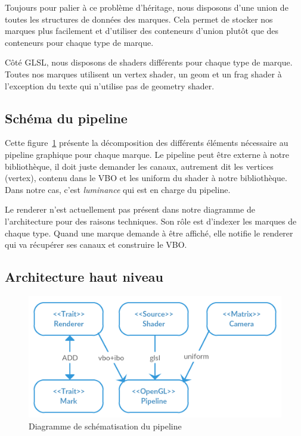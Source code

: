 \documentclass[12pt]{article}
\begin{document}
Toujours pour palier à ce problème d'héritage, nous disposons d'une union de toutes les structures
de données des marques. Cela permet de stocker nos marques plus facilement et d'utiliser des conteneurs d'union plutôt que des conteneurs pour chaque type de marque.

Côté GLSL, nous disposons de shaders différents pour chaque type de marque. Toutes nos marques utilisent un vertex shader, un \gls{geom} et un \gls{frag} shader à l'exception du texte qui n'utilise pas de geometry shader.

\subsection{Schéma du pipeline} %

Cette figure~\ref{fig:pipe} présente la décomposition des différents éléments nécessaire au \gls{pipeline}
graphique pour chaque marque. Le pipeline peut être externe à notre bibliothèque, il doit juste demander
les canaux, autrement dit les vertices (\gls{vertex}), contenu dans le \gls{VBO} et les \gls{uniform}
du \gls{shader} à notre bibliothèque\cite{Semi}.
Dans notre cas, c'est \textit{luminance} \cite{luminance} qui est en charge du pipeline.

Le renderer n'est actuellement pas présent dans notre diagramme de l'architecture pour des
raisons techniques. Son rôle est d'indexer les marques de chaque type. Quand une marque demande
à être affiché, elle notifie le renderer qui va récupérer ses canaux et construire le VBO.

\subsection{Architecture haut niveau}


\begin{figure}[htp]
  \centering
  \includegraphics[scale=0.8]{images/pipeline}
  \caption{Diagramme de schématisation du pipeline}
  \label{fig:pipe}
\end{figure}
\end{document}
